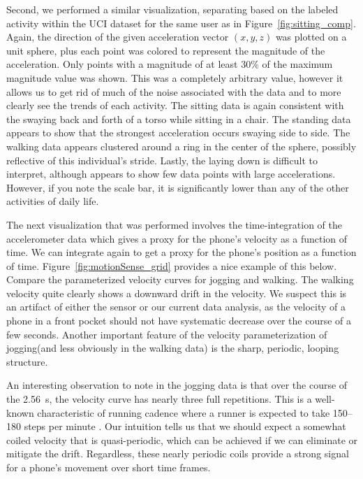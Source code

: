 Second, we performed a similar visualization, separating based on the labeled activity within the UCI dataset for the same user as in Figure~\ref{fig:sitting_comp}. Again, the direction of the given acceleration vector $(x,y,z)$ was plotted on a unit sphere, plus each point was colored to represent the magnitude of the acceleration. Only points with a magnitude of at least 30\% of the maximum magnitude value was shown. This was a completely arbitrary value, however it allows us to get rid of much of the noise associated with the data and to more clearly see the trends of each activity. The sitting data is again consistent with the swaying back and forth of a torso while sitting in a chair. The standing data appears to show that the strongest acceleration occurs swaying side to side. The walking data appears clustered around a ring in the center of the sphere, possibly reflective of this individual's stride. Lastly, the laying down is difficult to interpret, although appears to show few data points with large accelerations. However, if you note the scale bar, it is significantly lower than any of the other activities of daily life. 


The next visualization that was performed involves the time-integration of the accelerometer data which gives a proxy for the phone's velocity as a function of time. We can integrate again to get a proxy for the phone's position as a function of time. Figure~\ref{fig:motionSense_grid} provides a nice example of this below. Compare the parameterized velocity curves for jogging and walking. The walking velocity quite clearly shows a downward drift in the velocity. We suspect this is an artifact of either the sensor or our current data analysis, as the velocity of a phone in a front pocket should not have systematic decrease over the course of a few seconds. Another important feature of the velocity parameterization of jogging(and less obviously in the walking data) is the sharp, periodic, looping structure. 

An interesting observation to note in the jogging data is that over the course of the \SI{2.56}{\s}, the velocity curve has nearly three full repetitions. This is a well-known characteristic of running cadence where a runner is expected to take 150--180 steps per minute \cite{interview}. Our intuition tells us that we should expect a somewhat coiled velocity that is quasi-periodic, which can be achieved if we can eliminate or mitigate the drift. Regardless, these nearly periodic coils provide a strong signal for a phone's movement over short time frames.

